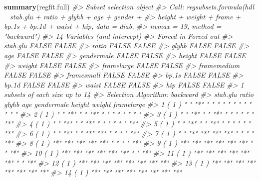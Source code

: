 \documentclass[]{book}
\newenvironment{Shaded}{\begin{snugshade}}{\end{snugshade}}
\newcommand{\KeywordTok}[1]{\textcolor[rgb]{0.13,0.29,0.53}{\textbf{#1}}}
\newcommand{\CommentTok}[1]{\textcolor[rgb]{0.56,0.35,0.01}{\textit{#1}}}
\newcommand{\NormalTok}[1]{#1}
\begin{document}
\begin{Shaded}
\begin{Highlighting}[]
\KeywordTok{summary}\NormalTok{(regfit.full)}
\CommentTok{#> Subset selection object}
\CommentTok{#> Call: regsubsets.formula(hdl ~ stab.glu + ratio + glyhb + age + gender + }
\CommentTok{#>     height + weight + frame + bp.1s + bp.1d + waist + hip, data = diab, }
\CommentTok{#>     nvmax = 19, method = "backward")}
\CommentTok{#> 14 Variables  (and intercept)}
\CommentTok{#>             Forced in Forced out}
\CommentTok{#> stab.glu        FALSE      FALSE}
\CommentTok{#> ratio           FALSE      FALSE}
\CommentTok{#> glyhb           FALSE      FALSE}
\CommentTok{#> age             FALSE      FALSE}
\CommentTok{#> gendermale      FALSE      FALSE}
\CommentTok{#> height          FALSE      FALSE}
\CommentTok{#> weight          FALSE      FALSE}
\CommentTok{#> framelarge      FALSE      FALSE}
\CommentTok{#> framemedium     FALSE      FALSE}
\CommentTok{#> framesmall      FALSE      FALSE}
\CommentTok{#> bp.1s           FALSE      FALSE}
\CommentTok{#> bp.1d           FALSE      FALSE}
\CommentTok{#> waist           FALSE      FALSE}
\CommentTok{#> hip             FALSE      FALSE}
\CommentTok{#> 1 subsets of each size up to 14}
\CommentTok{#> Selection Algorithm: backward}
\CommentTok{#>           stab.glu ratio glyhb age gendermale height weight framelarge}
\CommentTok{#> 1  ( 1 )  " "      "*"   " "   " " " "        " "    " "    " "       }
\CommentTok{#> 2  ( 1 )  " "      "*"   " "   "*" " "        " "    " "    " "       }
\CommentTok{#> 3  ( 1 )  " "      "*"   " "   "*" " "        " "    " "    "*"       }
\CommentTok{#> 4  ( 1 )  " "      "*"   " "   "*" " "        " "    " "    "*"       }
\CommentTok{#> 5  ( 1 )  " "      "*"   " "   "*" " "        " "    " "    "*"       }
\CommentTok{#> 6  ( 1 )  " "      "*"   " "   "*" "*"        " "    " "    "*"       }
\CommentTok{#> 7  ( 1 )  " "      "*"   "*"   "*" "*"        " "    " "    "*"       }
\CommentTok{#> 8  ( 1 )  "*"      "*"   "*"   "*" "*"        " "    " "    "*"       }
\CommentTok{#> 9  ( 1 )  "*"      "*"   "*"   "*" "*"        "*"    " "    "*"       }
\CommentTok{#> 10  ( 1 ) "*"      "*"   "*"   "*" "*"        "*"    " "    "*"       }
\CommentTok{#> 11  ( 1 ) "*"      "*"   "*"   "*" "*"        "*"    " "    "*"       }
\CommentTok{#> 12  ( 1 ) "*"      "*"   "*"   "*" "*"        "*"    "*"    "*"       }
\CommentTok{#> 13  ( 1 ) "*"      "*"   "*"   "*" "*"        "*"    "*"    "*"       }
\CommentTok{#> 14  ( 1 ) "*"      "*"   "*"   "*" "*"        "*"    "*"    "*"       }

\end{Highlighting}
\end{Shaded}
\end{document}
